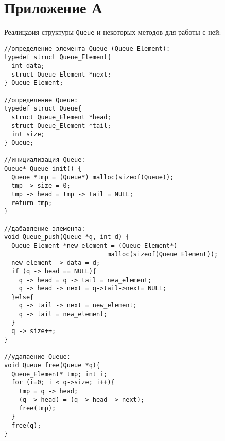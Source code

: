 \section{Приложение А}
Реалицазия структуры \texttt{Queue} и некоторых методов для работы с ней:
\begin{verbatim}
//определение элемента Queue (Queue_Element):
typedef struct Queue_Element{
  int data;
  struct Queue_Element *next;
} Queue_Element;

//определение Queue:
typedef struct Queue{
  struct Queue_Element *head;
  struct Queue_Element *tail;
  int size;
} Queue;

//инициализация Queue:
Queue* Queue_init() {
  Queue *tmp = (Queue*) malloc(sizeof(Queue));
  tmp -> size = 0;
  tmp -> head = tmp -> tail = NULL;
  return tmp;
}

//дабавление элемента:
void Queue_push(Queue *q, int d) {
  Queue_Element *new_element = (Queue_Element*)
                            malloc(sizeof(Queue_Element));
  new_element -> data = d;
  if (q -> head == NULL){
    q -> head = q -> tail = new_element;
    q -> head -> next = q->tail->next= NULL;
  }else{
    q -> tail -> next = new_element;
    q -> tail = new_element;
  }
  q -> size++;
}

//удалаение Queue:
void Queue_free(Queue *q){
  Queue_Element* tmp; int i;
  for (i=0; i < q->size; i++){
    tmp = q -> head;
    (q -> head) = (q -> head -> next);
    free(tmp);
  }
  free(q);
}
\end{verbatim}
